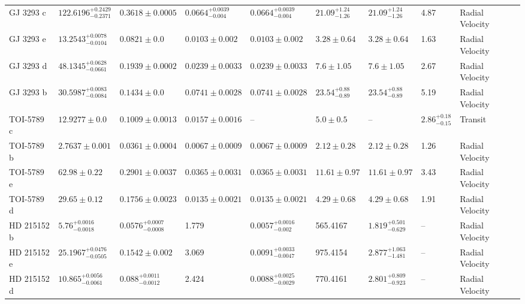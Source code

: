 \begin{tabular}{llllllllll}
GJ 3293 c & $122.6196^{+0.2429}_{-0.2371}$ & $0.3618 \pm 0.0005$ & $0.0664^{+0.0039}_{-0.004}$ & $0.0664^{+0.0039}_{-0.004}$ & $21.09^{+1.24}_{-1.26}$ & $21.09^{+1.24}_{-1.26}$ & 4.87 & Radial Velocity & \cite{ASTUDILLO_DEFRU_ET_AL__2017} \\
GJ 3293 e & $13.2543^{+0.0078}_{-0.0104}$ & $0.0821 \pm 0.0$ & $0.0103 \pm 0.002$ & $0.0103 \pm 0.002$ & $3.28 \pm 0.64$ & $3.28 \pm 0.64$ & 1.63 & Radial Velocity & \cite{ASTUDILLO_DEFRU_ET_AL__2017} \\
GJ 3293 d & $48.1345^{+0.0628}_{-0.0661}$ & $0.1939 \pm 0.0002$ & $0.0239 \pm 0.0033$ & $0.0239 \pm 0.0033$ & $7.6 \pm 1.05$ & $7.6 \pm 1.05$ & 2.67 & Radial Velocity & \cite{ASTUDILLO_DEFRU_ET_AL__2017} \\
GJ 3293 b & $30.5987^{+0.0083}_{-0.0084}$ & $0.1434 \pm 0.0$ & $0.0741 \pm 0.0028$ & $0.0741 \pm 0.0028$ & $23.54^{+0.88}_{-0.89}$ & $23.54^{+0.88}_{-0.89}$ & 5.19 & Radial Velocity & \cite{ASTUDILLO_DEFRU_ET_AL__2017} \\
TOI-5789 c & $12.9277 \pm 0.0$ & $0.1009 \pm 0.0013$ & $0.0157 \pm 0.0016$ & -- & $5.0 \pm 0.5$ & -- & $2.86^{+0.18}_{-0.15}$ & Transit & \cite{BONOMO_ET_AL_2026} \\
TOI-5789 b & $2.7637 \pm 0.001$ & $0.0361 \pm 0.0004$ & $0.0067 \pm 0.0009$ & $0.0067 \pm 0.0009$ & $2.12 \pm 0.28$ & $2.12 \pm 0.28$ & 1.26 & Radial Velocity & \cite{BONOMO_ET_AL_2026} \\
TOI-5789 e & $62.98 \pm 0.22$ & $0.2901 \pm 0.0037$ & $0.0365 \pm 0.0031$ & $0.0365 \pm 0.0031$ & $11.61 \pm 0.97$ & $11.61 \pm 0.97$ & 3.43 & Radial Velocity & \cite{BONOMO_ET_AL_2026} \\
TOI-5789 d & $29.65 \pm 0.12$ & $0.1756 \pm 0.0023$ & $0.0135 \pm 0.0021$ & $0.0135 \pm 0.0021$ & $4.29 \pm 0.68$ & $4.29 \pm 0.68$ & 1.91 & Radial Velocity & \cite{BONOMO_ET_AL_2026} \\
HD 215152 b & $5.76^{+0.0016}_{-0.0018}$ & $0.0576^{+0.0007}_{-0.0008}$ & 1.779 & $0.0057^{+0.0016}_{-0.002}$ & 565.4167 & $1.819^{+0.501}_{-0.629}$ & -- & Radial Velocity & \cite{DELISLE_ET_AL__2018} \\
HD 215152 e & $25.1967^{+0.0476}_{-0.0505}$ & $0.1542 \pm 0.002$ & 3.069 & $0.0091^{+0.0033}_{-0.0047}$ & 975.4154 & $2.877^{+1.063}_{-1.481}$ & -- & Radial Velocity & \cite{DELISLE_ET_AL__2018} \\
HD 215152 d & $10.865^{+0.0056}_{-0.0061}$ & $0.088^{+0.0011}_{-0.0012}$ & 2.424 & $0.0088^{+0.0025}_{-0.0029}$ & 770.4161 & $2.801^{+0.809}_{-0.923}$ & -- & Radial Velocity & \cite{DELISLE_ET_AL__2018} \\

\end{tabular}
